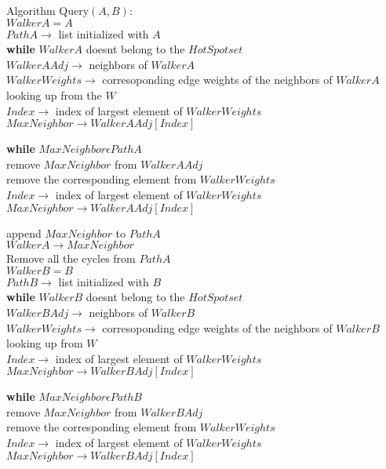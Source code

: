 \documentclass{article}
\begin{document}
Algorithm Query$(A,B)$:\\
	$WalkerA = A$\\
	$PathA\to$ list initialized with $A$\\
	\textbf{while} $WalkerA$ doesnt belong to the $HotSpot set$\\
		$WalkerAAdj\to$ neighbors of $WalkerA$\\
		$WalkerWeights\to$ corresoponding edge weights of the neighbors of $WalkerA$ looking up from the $W$\\
		$Index\to$ index of largest element of $WalkerWeights$\\
		$MaxNeighbor\to WalkerAAdj[Index]$ 

		\textbf{while} $MaxNeighbor \epsilon PathA$\\
			remove $MaxNeighbor$ from $WalkerAAdj$\\
			remove the corresponding element from $WalkerWeights$\\
			
			$Index\to$ index of largest element of $WalkerWeights$\\
			$MaxNeighbor\to WalkerAAdj[Index]$ 


		append $MaxNeighbor$ to $PathA$\\
		$WalkerA \to MaxNeighbor$\\
	Remove all the cycles from $PathA$\\

	$WalkerB = B$\\
	$PathB\to$ list initialized with $B$\\
	\textbf{while} $WalkerB$ doesnt belong to the $HotSpot set$\\
		$WalkerBAdj\to$ neighbors of $WalkerB$\\
		$WalkerWeights\to$ corresoponding edge weights of the neighbors of $WalkerB$ looking up from $W$\\
		$Index\to$ index of largest element of $WalkerWeights$\\
		$MaxNeighbor\to WalkerBAdj[Index]$ 

		\textbf{while} $MaxNeighbor \epsilon PathB$\\
			remove $MaxNeighbor$ from $WalkerBAdj$\\
			remove the corresponding element from $WalkerWeights$\\
			
			$Index\to$ index of largest element of $WalkerWeights$\\
			$MaxNeighbor\to WalkerBAdj[Index]$ 
\end{document}

